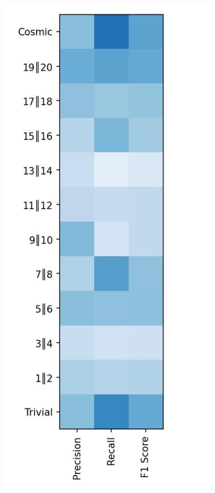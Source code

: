 \documentclass{article}
\begin{document}
	\begin{figure}[ht]
		\begin{minipage}[b]{0.32\linewidth}
			\centering
			\includegraphics[width=\linewidth]{12 - Multinomial Naive Bayes.png} 

\end{minipage}
\end{figure}
\end{document}
